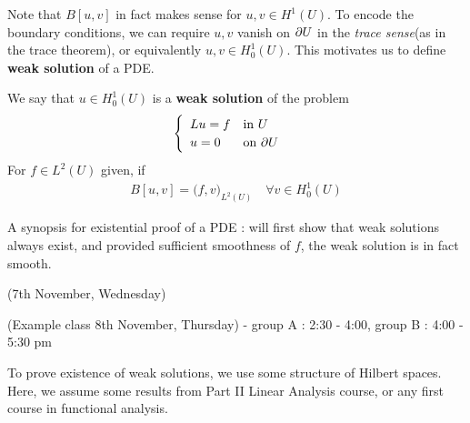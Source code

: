 \documentclass[12pt,a4paper]{report}
\begin{document}
Note that $B[u,v]$ in fact makes sense for $u,v\in H^1(U)$. To encode the boundary conditions, we can require $u,v$ vanish on $\partial U$ in the \emph{trace sense}(as in the trace theorem), or equivalently $u,v \in H_0^1(U)$. This motivates us to define \textbf{weak solution} of a PDE.
\s

 We say that $u\in H^1_0(U)$ is a \textbf{weak solution} of the problem
\begin{align*}
\begin{cases}
\begin{array}{ll}
Lu = f & \text{in } U \\
u =0 & \text{on } \partial U
\end{array}
\end{cases}
\end{align*}
For $f\in L^2(U)$ given, if
\begin{align*}
B[u,v] = \big( f,v \big)_{L^2(U)} \quad \forall v\in H_0^1 (U)
\end{align*}
\s

A synopsis for existential proof of a PDE : will first show that weak solutions always exist, and provided sufficient smoothness of $f$, the weak solution is in fact smooth.
\s

\newday

(7th November, Wednesday)
\s

(Example class 8th November, Thursday) - group A : 2:30 - 4:00, group B : 4:00 - 5:30 pm
\s

To prove existence of weak solutions, we use some structure of Hilbert spaces. Here, we assume some results from Part II Linear Analysis course, or any first course in functional analysis.
\s
\end{document}
